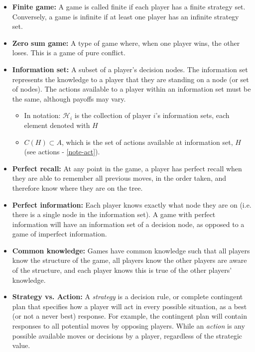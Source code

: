 \documentclass{article}
\begin{document}
\begin{itemize}
    \item \textbf{Finite game:} A game is called finite if each player has a finite strategy set. Conversely, a game is infinite if at least one player has an infinite strategy set.
    \item \textbf{Zero sum game:} A type of game where, when one player wins, the other loses. This is a game of pure conflict.
    \item \textbf{Information set:} A subset of a player's decision nodes. The information set represents the knowledge to a player that they are standing on a node (or set of nodes). The actions available to a player within an information set must be the same, although payoffs may vary. 
    \begin{itemize}
        \item In notation: $\mathcal{H}_i$ is the collection of player $i$'s information sets, each element denoted with $H$
        \item $C(H) \subset A$, which is the set of actions available at information set, $H$ (see actions - \ref{note-act}).
    \end{itemize}
    \item \textbf{Perfect recall:} At any point in the game, a player has perfect recall when they are able to remember all previous moves, in the order taken, and therefore know where they are on the tree.
    \item \textbf{Perfect information:} Each player knows exactly what node they are on (i.e. there is a single node in the information set). A game with perfect information will have an information set of a decision node, as opposed to a game of imperfect information. 
    \item \textbf{Common knowledge:} Games have common knowledge such that all players know the structure of the game, all players know the other players are aware of the structure, and each player knows this is true of the other players' knowledge.
    \item \textbf{Strategy vs. Action:} A \textit{strategy} is a decision rule, or complete contingent plan that specifies how a player will act in every possible situation, as a best (or not a never best) response. For example, the contingent plan will contain responses to all potential moves by opposing players. While an \textit{action} is any possible available moves or decisions by a player, regardless of the strategic value. 
    \begin{itemize}

\end{itemize}
\end{itemize}
\end{document}
